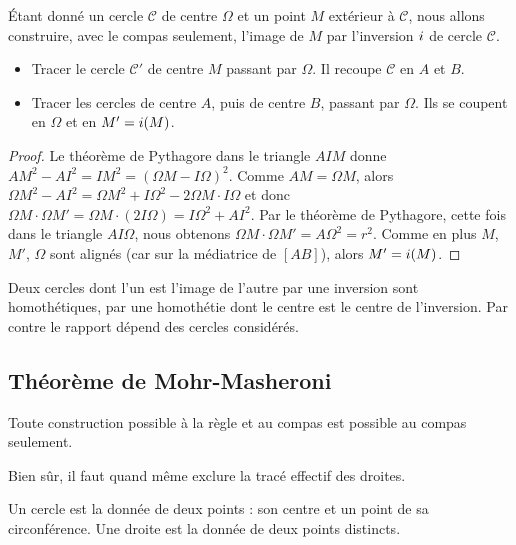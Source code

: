 \documentclass[11pt,class=report,crop=false]{standalone}
\begin{document}
\'Etant donné un cercle $\mathcal{C}$ de centre $\Omega$ et un point $M$
extérieur à $\mathcal{C}$, nous allons construire, avec le compas seulement, 
l'image de $M$ par l'inversion $i$ de cercle $\mathcal{C}$.
\begin{itemize}
  \item Tracer le cercle $\mathcal{C}'$ de centre $M$ passant par $\Omega$. Il recoupe $\mathcal{C}$ en $A$ et $B$.
  
  \item Tracer les cercles de centre $A$, puis de centre $B$, passant par 
  $\Omega$. Ils se coupent en $\Omega$ et en $M' = i(M)$.
\end{itemize}


\begin{proof}
Le théorème de Pythagore dans le triangle $AIM$ donne
$AM ^2 - AI^2 = IM^2 = (\Omega M - I \Omega)^2$. Comme $AM=\Omega M$,
alors $\Omega M^2 - AI^2 = \Omega M^2 + I\Omega^2 - 2 \Omega M \cdot I\Omega$ et donc
$\Omega M \cdot \Omega M' = \Omega M \cdot(2I\Omega) = I\Omega^2 + AI^2$.
Par le théorème de Pythagore, cette fois dans le triangle $AI\Omega$,
nous obtenons $\Omega M \cdot \Omega M' = A\Omega ^2 = r^2$. 
Comme en plus $M$, $M'$, $\Omega$ sont alignés (car sur la médiatrice de $[AB]$), alors
$M' = i(M)$.
\end{proof}


\begin{remarque*}
Deux cercles dont l'un est l'image de l'autre par une inversion sont homothétiques,
par une homothétie dont le centre est le centre de l'inversion. Par contre le rapport
dépend des cercles considérés.
\end{remarque*}


\subsection{Théorème de Mohr-Masheroni}

\begin{theoreme}
Toute construction possible à la règle et au compas
est possible au compas seulement.
\end{theoreme}

Bien sûr, il faut quand même exclure la tracé effectif des droites.

Un cercle est la donnée de deux points : son centre et un point de sa circonférence.
Une droite est la donnée de deux points distincts.
\end{document}
